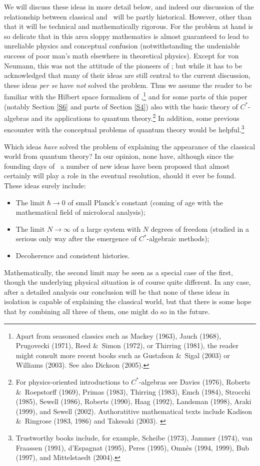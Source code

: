 \documentclass[12pt,titlepage]{article}
\newcommand{\ca}{$C^*$-algebra} \newcommand{\jba}{JB-algebra}
\newcommand{\raw}{\rightarrow} \newcommand{\rat}{\mapsto}
\begin{document}
We will discuss these ideas in more detail below, and indeed our discussion of the relationship between classical and \qm\ will be partly historical. However, other than that it will be technical and mathematically rigorous. For the problem at hand is so delicate that in this area sloppy mathematics is almost guaranteed to lead to unreliable physics and conceptual confusion (notwithstanding the undeniable success of poor man's math elsewhere in theoretical physics). Except for von Neumann, this was not the attitude of the pioneers of \qm; but while it has to be acknowledged that many of their ideas are still central to the current discussion, these ideas {\it per se} have {\it not} solved the problem. Thus we assume the reader to be familiar with the Hilbert space formalism of \qm,\footnote{
Apart from seasoned classics such as Mackey (1963), Jauch (1968), Prugovecki (1971), Reed \&\ Simon (1972), or Thirring (1981), the reader might consult more recent books such as Gustafson \&\ Sigal (2003) or  Williams (2003). See also Dickson (2005).} 
and for some parts of this paper (notably Section \ref{S6} and parts of Section \ref{S4}) also with the basic theory of \ca s and its applications to quantum theory.\footnote{For physics-oriented introductions to \ca s see Davies (1976), Roberts \&\ Roepstorff (1969), Primas (1983), Thirring (1983), Emch (1984), Strocchi (1985), Sewell (1986), Roberts (1990), Haag (1992), Landsman (1998), Araki (1999), and Sewell (2002).  Authoratitive mathematical texts include Kadison \&\ Ringrose (1983, 1986) and Takesaki (2003). \label{Cstarlit}} In addition, some previous encounter with the conceptual problems of quantum theory would be helpful.\footnote{Trustworthy books include, for example,  
Scheibe (1973), Jammer (1974), van Fraassen (1991), d'Espagnat (1995), Peres (1995), 
Omn\`{e}s (1994, 1999), Bub (1997), and Mittelstaedt  (2004).\label{QMtexts}}

Which ideas {\it have} solved the problem of explaining the appearance of the classical world from quantum theory? In our opinion, none have, although since the founding days of \qm\ a number of new ideas have been proposed that almost certainly will play a role in the eventual resolution, should it ever be found. These ideas surely include:
\begin{itemize}
\item 
The limit $\hbar\rightarrow 0$ of small Planck's constant (coming of age with the mathematical field of microlocal analysis);
\item The limit $N\raw\infty$ of a large system with $N$ degrees of freedom (studied in a serious only way after the emergence of \ca ic methods);
\item 
Decoherence and consistent histories. 
\end{itemize}
Mathematically, the second limit may be seen as a special case of the first, though the underlying physical situation is of course quite different. In any case, after a detailed analysis our 
conclusion will be that none of these ideas in isolation is capable of explaining the classical world, but that there is some hope that by combining all three of them, one might do so in the future. 
\end{document}
